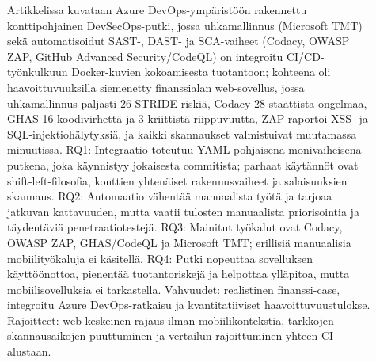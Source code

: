 \documentclass[bscthesis,finnish,oneside,biblatex]{uefcsthesis}
\begin{document}
\begin{description}
    \item[\cite{kushwaha2024_cct}]Artikkelissa kuvataan Azure DevOps-ympäristöön rakennettu konttipohjainen DevSecOps-putki, jossa uhkamallinnus (Microsoft TMT) sekä automatisoidut SAST-, DAST- ja SCA-vaiheet (Codacy, OWASP ZAP, GitHub Advanced Security/CodeQL) on integroitu CI/CD-työnkulkuun Docker-kuvien kokoamisesta tuotantoon; kohteena oli haavoittuvuuksilla siemenetty finanssialan web-sovellus, jossa uhkamallinnus paljasti 26 STRIDE-riskiä, Codacy 28 staattista ongelmaa, GHAS 16 koodivirhettä ja 3 kriittistä riippuvuutta, ZAP raportoi XSS- ja SQL-injektiohälytyksiä, ja kaikki skannaukset valmistuivat muutamassa minuutissa. RQ1: Integraatio toteutuu YAML-pohjaisena monivaiheisena putkena, joka käynnistyy jokaisesta commitista; parhaat käytännöt ovat shift-left-filosofia, konttien yhtenäiset rakennusvaiheet ja salaisuuksien skannaus. RQ2: Automaatio vähentää manuaalista työtä ja tarjoaa jatkuvan kattavuuden, mutta vaatii tulosten manuaalista priorisointia ja täydentäviä penetraatiotestejä. RQ3: Mainitut työkalut ovat Codacy, OWASP ZAP, GHAS/CodeQL ja Microsoft TMT; erillisiä manuaalisia mobiilityökaluja ei käsitellä. RQ4: Putki nopeuttaa sovelluksen käyttöönottoa, pienentää tuotantoriskejä ja helpottaa ylläpitoa, mutta mobiilisovelluksia ei tarkastella. Vahvuudet: realistinen finanssi-case, integroitu Azure DevOps-ratkaisu ja kvantitatiiviset haavoittuvuustulokse. Rajoitteet: web-keskeinen rajaus ilman mobiilikontekstia, tarkkojen skannausaikojen puuttuminen ja vertailun rajoittuminen yhteen CI-alustaan.
\end{description}
\end{document}

